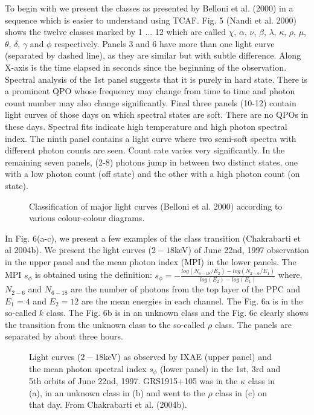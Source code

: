 \documentclass[referee]{cjaa}           %
\begin{document}
To begin with we present the classes as presented by Belloni et al. (2000)
in a sequence which is easier to understand using TCAF. Fig. 5 (Nandi et al. 2000)
shows the twelve classes marked by 1 ... 12 which are called  $\chi$, $\alpha$, $\nu$, $\beta$, $\lambda$, $\kappa$,
$\rho$, $\mu$, $\theta$, $\delta$, $\gamma$ and $\phi$ respectively.  Panels 3 and 6 have more than one light curve
(separated by dashed line), as they are similar but  with subtle difference. Along X-axis
is the time elapsed in seconds since the beginning of the observation. Spectral analysis of the 1st
panel suggests that it is purely in hard state. There is a prominent
QPO whose frequency may change from time to time and photon count number may also change
significantly. Final three panels (10-12) contain
light curves of those days on which spectral states are soft. There are no QPOs in these
days. Spectral fits indicate high temperature and high photon spectral index.
The ninth panel contains a light curve where two semi-soft
spectra with different photon counts are seen. Count rate varies very significantly.
In the remaining seven panels, (2-8) photons jump in between two distinct states, one with a low photon count
(off state) and the other with a high photon count (on state). 

\begin{figure}
   \begin{center}
\vskip -3.0cm
   \mbox{\textwidth{}\textwidth{}}
\vskip -4.0cm
   \caption{Classification of major light curves (Belloni et al. 2000) according to various colour-colour 
diagrams.} 
   \end{center}
\end{figure}

In Fig. 6(a-c), we present  a few examples of the class transition (Chakrabarti et al 2004b).
We present the light curves ($2-18$keV) of June 22nd, 1997 observation in the upper panel
and the mean photon index (MPI) in the lower panels. The MPI $s_\phi$ is obtained using the definition:
$s_\phi=- \frac{log(N_{6-18}/E_2) - log(N_{2-6}/E_1)}{log(E_2)-log(E_1)}$
where, $N_{2-6}$ and $N_{6-18}$ are the number of photons from the top layer of the PPC
and $E_1=4$ and $E_2=12$ are the mean energies in each channel. The Fig. 6a is in the 
so-called $k$ class. The Fig. 6b is in an unknown class and the Fig. 6c 
clearly shows the transition from the unknown class to the so-called $\rho$ class. 
The panels are separated by about three hours.

\begin{figure}
   \begin{center}
\vskip -3.0cm
   \mbox{\textwidth{}\textwidth{}}
\vskip -2.0cm
   \caption{Light curves ($2-18$keV) as observed by IXAE (upper panel)
and the mean photon spectral index $s_\phi$ (lower panel) in the 1st, 3rd and 5th orbits
of June 22nd, 1997. GRS1915+105 was in the $\kappa$ class in (a), in an unknown class in (b)
and went to the $\rho$ class in (c) on that day. From Chakrabarti et al. (2004b).} 
   \end{center}
\end{figure}
\end{document}
